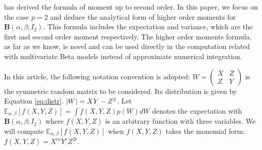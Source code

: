 \documentclass[twoside]{article}%
\DeclarePairedDelimiter\abs{\lvert}{\rvert}
\def\E{\mathbb{E}}
\begin{document}
\cite{konno_1988}
has derived the formula of moment up to second order.
In this paper, we focus on the case $p=2$ and deduce the analytical form of 
higher order moments for $\mathbf{B}(\alpha, \beta; I_2)$.
This formula
includes the expectation and variance, which are the first and second
order moment respectively. The higher order moments formula, as
far as we know, is novel and can be used directly in the computation
related with multivariate Beta models instead of approximate
numerical integration.

In this article, the following notation convention is adopted:
$W=\begin{pmatrix} X & Z \\ Z & Y \end{pmatrix}$ is the symmetric random
matrix to be considered. Its distribution is given by Equation \eqref{eq:distr}.
$\abs{W}=XY-Z^2$.
Let $\E_{\alpha,\beta}[f(X,Y, Z)] = \int f(X,Y,Z)p(W)dW$ denotes the expectation
with $\mathbf{B}(\alpha, \beta;I_2)$ where $f(X, Y, Z)$ is an arbitrary function with three
variables. We will compute $\E_{\alpha,\beta}[f(X,Y, Z)]$
when $f(X,Y,Z)$ takes the monomial form: $f(X,Y,Z)=X^m Y^r Z^{2t}$.
\end{document}
